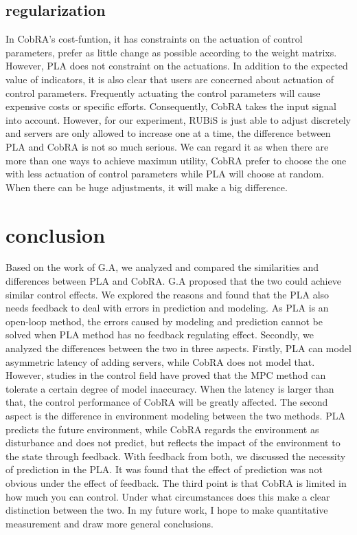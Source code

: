 \documentclass[sigconf]{acmart}
\begin{document}
\subsection{regularization}
In CobRA's cost-funtion, it has constraints on the actuation of control parameters, prefer as little change as possible according to the weight matrixs. However, PLA does not constraint on the actuations. In addition to the expected value of indicators, it is also clear that users are concerned about actuation of control parameters. Frequently actuating the control parameters will cause expensive costs or specific efforts. Consequently, CobRA takes the input signal into account. However, for our experiment, RUBiS is just able to adjust discretely and servers are only allowed to increase one at a time, the difference between PLA and CobRA is not so much serious. We can regard it as when there are more than one ways to achieve maximun utility, CobRA prefer to choose the one with less actuation of control parameters while PLA will choose at random. When there can be huge adjustments, it will make a big difference.

\section{conclusion}
Based on the work of G.A\cite{GA}, we analyzed and compared the similarities and differences between PLA and CobRA.
G.A proposed that the two could achieve similar control effects. We explored the reasons and found that the PLA also needs feedback to deal with errors in prediction and modeling.
As PLA is an open-loop method, the errors caused by modeling and prediction cannot be solved when PLA method has no feedback regulating effect.
Secondly, we analyzed the differences between the two in three aspects. Firstly, PLA can model asymmetric latency of adding servers, while CobRA does not model that. However, studies in the control field have proved that the MPC method can tolerate a certain degree of model inaccuracy.
When the latency is larger than that, the control performance of CobRA will be greatly affected.
The second aspect is the difference in environment modeling between the two methods. PLA predicts the future environment, while CobRA regards the environment as disturbance and does not predict, but reflects the impact of the environment to the state through feedback.
With feedback from both, we discussed the necessity of prediction in the PLA.
It was found that the effect of prediction was not obvious under the effect of feedback.
The third point is that CobRA is limited in how much you can control.
Under what circumstances does this make a clear distinction between the two.
In my future work, I hope to make quantitative measurement and draw more general conclusions.


\end{document}
